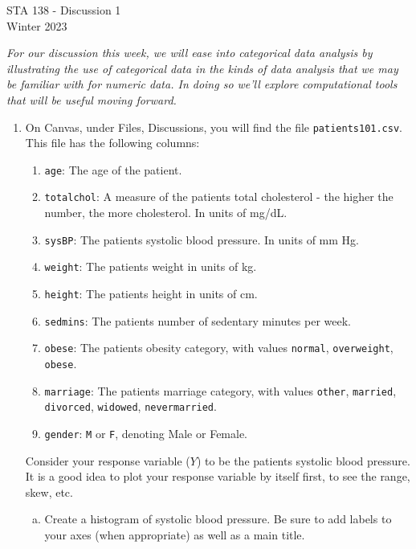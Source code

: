 \documentclass[twocolumn, 10pt, oneside]{article}
\begin{document}
\begin{center} STA 138 - Discussion 1\\
  Winter 2023
\end{center}

\emph{For our discussion this week, we will ease into categorical data analysis by illustrating the use of categorical data in the kinds of data analysis that we may be familiar with for numeric data. In doing so we'll explore computational tools that will be useful moving forward.}

\begin{enumerate}
\item On Canvas, under Files, Discussions, you will find the file \texttt{patients101.csv}.  This file has the following columns:
\begin{enumerate}[Column 1:]
	\item \texttt{age}: The age of the patient.
	\item \texttt{totalchol}:  A measure of the patients total cholesterol - the higher the number, the more cholesterol.  In units of mg/dL.
	\item \texttt{sysBP}: The patients systolic blood pressure.  In units of mm Hg.
	\item \texttt{weight}: The patients weight in units of kg.
	\item \texttt{height}: The patients height in units of cm.
	\item \texttt{sedmins}: The patients number of sedentary minutes per week.
	\item \texttt{obese}: The patients obesity category, with values \texttt{normal}, \texttt{overweight}, \texttt{obese}.
	\item \texttt{marriage}: The patients marriage category, with values \texttt{other}, \texttt{married}, \texttt{divorced}, \texttt{widowed}, \texttt{nevermarried}. 
	\item \texttt{gender}: \texttt{M} or \texttt{F}, denoting Male or Female.
\end{enumerate}
Consider your response variable  ($Y$) to be the patients systolic blood pressure.  It is a good idea to plot your response variable by itself first, to see the range, skew, etc.
\begin{enumerate}[(a)]
	\item Create a histogram of systolic blood pressure.  Be sure to add labels to your axes (when appropriate) as well as a main title.

\end{enumerate}
\end{enumerate}
\end{document}
